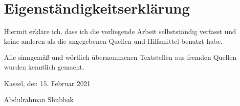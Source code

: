 

    


\cleardoublepage
\setcounter{page}{1}



\printbibheading[
	heading=bibintoc
	]
\printbibliography[
	heading=subbibintoc,
	notkeyword=database, 
	nottype=book,
	heading=subbibliography,
	title={Wissenschaftliche Arbeiten}
	]
\printbibliography[
	heading=subbibintoc,
	keyword=database,
	nottype=article,
	heading=subbibliography,
	title={Datenbanken}
	]
\printbibliography[
	heading=subbibintoc,
	notkeyword=database,
	type=book,
	heading=subbibliography,
	title={Lehrb\"ucher}
	]




\newpage
\section{Eigenst\"andigkeitserkl\"arung}
Hiermit erkl\"are ich, dass ich die vorliegende Arbeit selbstst\"andig verfasst und keine anderen als die angegebenen Quellen und Hilfsmittel benutzt habe.

Alle sinngem\"a\ss{} und w\"ortlich \"ubernommenen Textstellen aus fremden Quellen wurden kenntlich gemacht.

Kassel, den 15. Februar 2021

\vspace{30pt}
Abdulrahman Shubbak


